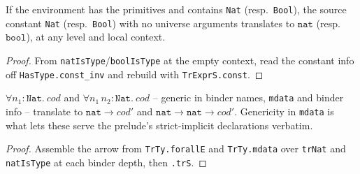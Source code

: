 \begin{lemma}
\label{vpc:thm:prim-trnat-trbool}
\leanok
{}

 If the environment has the primitives and contains \texttt{Nat} (resp.\
\texttt{Bool}), the source constant \texttt{Nat} (resp.\ \texttt{Bool}) with no universe
arguments translates to $\mathtt{nat}$ (resp.\ $\mathtt{bool}$), at any level and local context.
\end{lemma}
\begin{proof}\leanok
{}
 From \texttt{natIsType}/\texttt{boolIsType} at the empty context, read the constant
info off \texttt{HasType.const\_inv} and rebuild with \texttt{TrExprS.const}.
\end{proof}

\begin{lemma}
\label{vpc:thm:prim-natarrow}
\leanok
\uses{family:trterm-builders}

 $\forall n_1 : \mathtt{Nat}.\ \mathit{cod}$ and $\forall n_1\,n_2 :
\mathtt{Nat}.\ \mathit{cod}$ -- generic in binder names, \texttt{mdata} and binder info --
translate to $\mathtt{nat} \to \mathit{cod}'$ and $\mathtt{nat} \to \mathtt{nat} \to
\mathit{cod}'$.
 Genericity in \texttt{mdata} is what lets these serve the prelude's
strict-implicit declarations verbatim.
\end{lemma}
\begin{proof}\leanok
{}
 Assemble the arrow from \texttt{TrTy.forallE} and \texttt{TrTy.mdata} over
\texttt{trNat} and \texttt{natIsType} at each binder depth, then \texttt{.trS}.
\end{proof}


